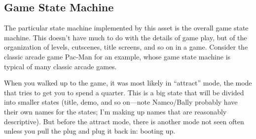 \documentclass[letter,12pt]{article}
\begin{document}
\subsection{Game State Machine}
The particular state machine implemented by this asset is the overall game state machine.  This doesn’t have much to do with the details of game play, but of the organization of levels, cutscenes, title screens, and so on in a game.  Consider the classic arcade game Pac-Man for an example, whose game state machine is typical of many classic arcade games.

When you walked up to the game, it was most likely in “attract” mode, the mode that tries to get you to spend a quarter.  This is a big state that will be divided into smaller states (title, demo, and so on—note Namco/Bally probably have their own names for the states; I’m making up names that are reasonably descriptive).  But before the attract mode, there is another mode not seen often unless you pull the plug and plug it back in: booting up.
\end{document}
